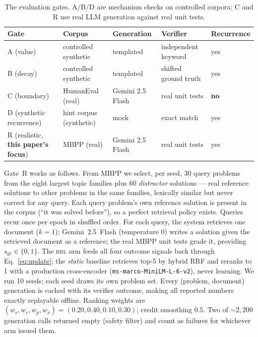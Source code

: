 \documentclass[11pt]{article}
\newcommand{\rrl}{\textsc{rrl}}
\newcommand{\sgt}{s_{\mathrm{gt}}}
\begin{document}
\begin{table}[t]
\centering\small
\begin{tabular}{@{}lllll@{}}
\toprule
Gate & Corpus & Generation & Verifier & Recurrence \\
\midrule
A (value)     & controlled synthetic & templated      & independent keyword    & yes \\
B (decay)     & controlled synthetic & templated      & shifted ground truth   & yes \\
C (boundary)  & HumanEval (real)     & Gemini 2.5 Flash & real unit tests      & \textbf{no} \\
D (synthetic recurrence) & hint corpus (synthetic) & mock & exact match        & yes \\
R (realistic, \textbf{this paper's focus}) & MBPP (real) & Gemini 2.5 Flash & real unit tests & yes \\
\bottomrule
\end{tabular}
\caption{The evaluation gates. A/B/D are mechanism checks on controlled
corpora; C and R use real LLM generation against real unit tests.}
\label{tab:gates}
\end{table}

Gate~R works as follows. From MBPP \citep{austin2021mbpp} we select, per
seed, 30 query problems from the eight largest topic families plus 60
\emph{distractor} solutions --- real reference solutions to other problems in
the same families, lexically similar but never correct for any query. Each
query problem's own reference solution is present in the corpus (``it was
solved before''), so a perfect retrieval policy exists. Queries recur once
per epoch in shuffled order. For each query, the system retrieves one
document ($k{=}1$); Gemini~2.5~Flash (temperature $0$) writes a solution
given the retrieved document as a reference; the real MBPP unit tests grade
it, providing $\sgt \in \{0,1\}$. The \rrl{} arm feeds all four outcome
signals back through Eq.~\eqref{eq:update}; the \emph{static} baseline
retrieves top-5 by hybrid RRF and reranks to 1 with a production
cross-encoder (\texttt{ms-marco-MiniLM-L-6-v2}), never learning. We run 10
seeds; each seed draws its own problem set. Every (problem, document)
generation is cached with its verifier outcome, making all reported numbers
exactly replayable offline. Ranking weights are
$(w_s, w_c, w_p, w_x) = (0.20, 0.40, 0.10, 0.30)$; credit smoothing $0.5$.
Two of ${\sim}2{,}200$ generation calls returned empty (safety filter) and
count as failures for whichever arm issued them.
\end{document}
